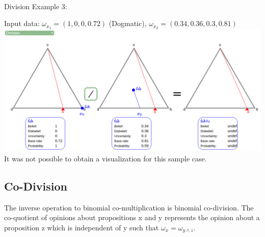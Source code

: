 \documentclass[UTF8]{article}
\newcommand{\opinion}[5]{$\omega_{#1} = (#2, #3, #4, #5)$}
\begin{document}
    \hrulefill\\
Division Example 3:
    \begin{center}
        Input data: 
        \opinion{x_1}{1}{0}{0}{0.72} (Dogmatic), 
        \opinion{x_2}{0.34}{0.36}{0.3}{0.81}\\
        \includegraphics[width=6in]{images/div3.png}
        It was not possible to obtain a visualization for this sample case.
\end{center}

\subsection{Co-Division}
The inverse operation to binomial co-multiplication is binomial co-division. The co-quotient
of opinions about propositions x and y represents the opinion about a proposition z
which is independent of y such that $\omega_x = \omega_{y \land z}$.
\end{document}
